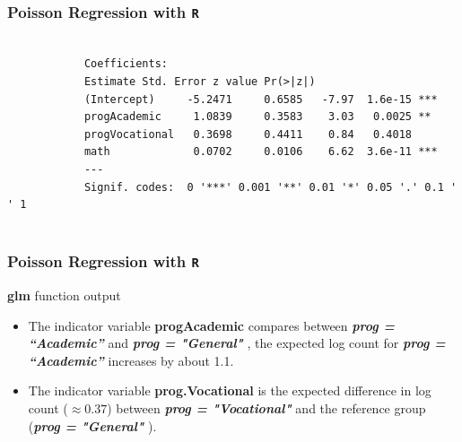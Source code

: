 \documentclass[00-GLMregslides.tex]{subfiles}
\begin{document}
		\begin{frame}[fragile]
			
			\frametitle{Poisson Regression with \texttt{R}}
			
			\begin{verbatim}
			
			Coefficients:
			Estimate Std. Error z value Pr(>|z|)    
			(Intercept)     -5.2471     0.6585   -7.97  1.6e-15 ***
			progAcademic     1.0839     0.3583    3.03   0.0025 ** 
			progVocational   0.3698     0.4411    0.84   0.4018    
			math             0.0702     0.0106    6.62  3.6e-11 ***
			---
			Signif. codes:  0 '***' 0.001 '**' 0.01 '*' 0.05 '.' 0.1 ' ' 1
			
			\end{verbatim}
			
		\end{frame}
\begin{frame}[fragile]
\frametitle{Poisson Regression with \texttt{R}}
\Large 
\textbf{glm} function output
	\begin{itemize}

\item The indicator variable \textbf{progAcademic} compares between \textbf{\textit{prog = “Academic” }}and \textbf{\textit{prog = "General"}} , the expected log 
count for \textbf{\textit{prog = “Academic” }}increases by about 1.1. 
\item The indicator variable \textbf{prog.Vocational}  is the expected difference in log count (\(\approx 0.37\)) between 
\textbf{\textit{prog = "Vocational"}} and the reference group (\textbf{\textit{prog = "General"}} ).
\end{itemize}
\end{frame}
\end{document}
